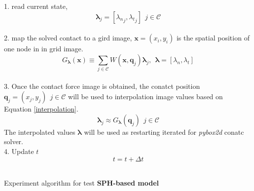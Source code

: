     \begin{algorithm}[!ht]
        {
            1. read current state,
                $$\pmb{\lambda}_{j}=[{\lambda_{n}}_{j}, {\lambda_{t}}_{j}]~~j\in\mathcal{C}$$ \\
            2. map the solved contact to a gird image, $\mathbf{x}=(x_i, y_i)$ is the spatial position of one node in in grid image.
                $$G_{\pmb{\lambda}}(\mathbf{x}) \equiv \sum_{j \in \mathcal{C}} W(\mathbf{x}, \pmb{q}_{j})\pmb{\lambda}_{j},~~\pmb{\lambda}=[\lambda_n, \lambda_t]$$ \\
            3. Once the contact force image is obtained,  the conatct position $\pmb{q}_{j} = (x_{j}, y_{j})~~j\in\mathcal{C}$  will be used to interpolation image values based on Equation \ref{interpolation}.
                $$\pmb{\lambda}_j \approx G_{\pmb{\lambda}}(\pmb{q}_j)~~j\in\mathcal{C}$$ 
            The interpolated values $\pmb{\lambda}$ will be used as restarting iterated for \textit{pybox2d} conatc solver. \\
            4. Update $t$
                $$t = t + \Delta t$$ \\
        }
        \caption{Experiment algorithm for test \textbf{SPH-based model}}
    \end{algorithm}


